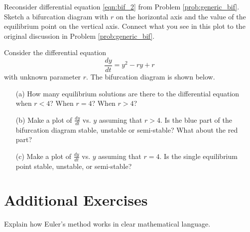 \begin{problem}
    Reconsider differential equation \eqref{eqn:bif_2} from Problem
    \ref{prob:generic_bif}.  Sketch a bifurcation diagram with $r$ on the horizontal axis
    and the value of the equilibrium point on the vertical axis.  Connect what you see in
    this plot to the original discussion in Problem \ref{prob:generic_bif}.
\end{problem}

\begin{problem}
    Consider the differential equation 
    \[ \frac{dy}{dt} = y^2 - ry + r \]
    with unknown parameter $r$.  The bifurcation diagram is shown below.  
\begin{center}
\end{center}
\begin{enumerate}
    \item[(a)] How many equilibrium solutions are there to the differential equation when
        $r<4$? When $r=4$? When $r>4$?
    \item[(b)] Make a plot of $\frac{dy}{dt}$ vs. $y$ assuming that $r > 4$.  Is the blue
        part of the bifurcation diagram stable, unstable or semi-stable?  What about the
        red part?
    \item[(c)] Make a plot of $\frac{dy}{dt}$ vs. $y$ assuming that $r = 4$.  Is the
        single equilibrium point stable, unstable, or semi-stable?
\end{enumerate}
\end{problem}


\newpage\section{Additional Exercises}

\begin{problem}
    Explain how Euler's method works in clear mathematical language.
\end{problem}

